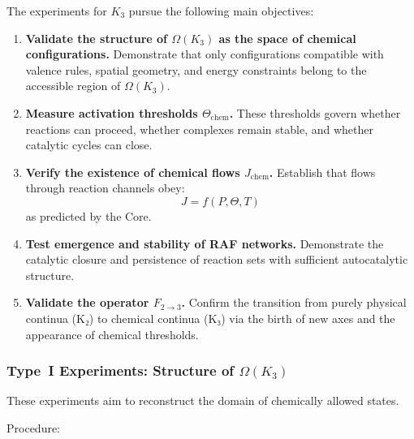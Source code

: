 The experiments for $K_3$ pursue the following main objectives:

\begin{enumerate}
    \item \textbf{Validate the structure of $\Omega(K_3)$ as the space of 
          chemical configurations.}  
          Demonstrate that only configurations compatible with valence rules, 
          spatial geometry, and energy constraints belong to the accessible 
          region of $\Omega(K_3)$.

    \item \textbf{Measure activation thresholds $\Theta_{\mathrm{chem}}$.}  
          These thresholds govern whether reactions can proceed, whether 
          complexes remain stable, and whether catalytic cycles can close.

    \item \textbf{Verify the existence of chemical flows $J_{\mathrm{chem}}$.}  
          Establish that flows through reaction channels obey:
          \[
              J = f(P, \Theta, T)
          \]
          as predicted by the Core.

    \item \textbf{Test emergence and stability of RAF networks.}  
          Demonstrate the catalytic closure and persistence of reaction sets 
          with sufficient autocatalytic structure.

    \item \textbf{Validate the operator $F_{2 \rightarrow 3}$.}  
          Confirm the transition from purely physical continua (K₂) to chemical 
          continua (K₃) via the birth of new axes and the appearance of 
          chemical thresholds.
\end{enumerate}



\subsubsection{Type~I Experiments: Structure of \texorpdfstring{$\Omega(K_3)$}{\Omega(K_3)}}

These experiments aim to reconstruct the domain of chemically allowed states.

Procedure:

